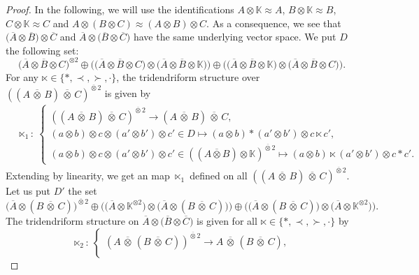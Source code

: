 \documentclass[10pt,a4paper]{amsart}
\numberwithin{equation}{section}
\theoremstyle{definition}
\theoremstyle{plain}
\newcommand{\K}{\mathbb{K}}
\begin{document}
\begin{proof}
In the following, we will use the identifications $A\otimes \K\approx A$, $B\otimes \K\approx B$, $C\otimes \K\approx C$ and $A\otimes(B\otimes C)\approx (A\otimes B)\otimes C$. As a consequence, we see that $\big(\overline{A}\otimes \overline{B}\big)\otimes \overline{C}$ and $\overline{A}\otimes \big(\overline{B}\otimes \overline{C}\big)$ have the same underlying vector space.
 We put $D$ the following set:
 \[
 \big(\overline{A} \otimes \overline{B}\otimes C\big)^{\otimes 2} \oplus\big(\big(\overline{A}\otimes \overline{B}\otimes C\big)\otimes \big(\overline{A}\otimes \overline{B}\otimes \K\big)\big) \oplus \big(\big(\overline{A}\otimes \overline{B}\otimes \K\big)\otimes \big(\overline{A}\otimes \overline{B}\otimes C\big)\big).
 \]
 For any $\ltimes\in\{*,\prec,\succ,\cdot\}$, the tridendriform structure over $((A \,\overline{\otimes}\, B)\,\overline{\otimes}\, C)^{\overline{\otimes} 2}$ is given by
	\begin{align*}
	&\ltimes_{1}\colon \ \begin{cases}
	 ((A \,\overline{\otimes}\, B)\,\overline{\otimes}\, C)^{\overline{\otimes} 2} \rightarrow (A\,\overline{\otimes}\,B)\,\overline{\otimes}\, C ,\\
	(a\otimes b)\otimes c \otimes (a'\otimes b')\otimes c'\in D \mapsto (a\otimes b)*(a'\otimes b')\otimes c\ltimes c', \\
	(a\otimes b)\otimes c \otimes (a'\otimes b')\otimes c'\in ((A\overline{\otimes} B)\otimes \K)^{\overline{\otimes} 2} \mapsto (a\otimes b)\ltimes(a'\otimes b')\otimes c* c'.
	\end{cases}
\end{align*}
Extending by linearity, we get an map $\ltimes_{1}$ defined on all $((A\,\overline{\otimes}\, B)\,\overline{\otimes}\, C)^{\overline{\otimes} 2}.$
Let us put $D'$ the set
\[
\big(\overline{A}\otimes (B\,\overline{\otimes}\,C)\big)^{\overline{\otimes} 2}\oplus \big(\big(\overline{A}\otimes \K^{\otimes 2}\big)\otimes \big(\overline{A}\otimes (B\,\overline{\otimes}\,C)\big)\big)\oplus \big(\big(\overline{A}\otimes (B\,\overline{\otimes}\,C)\big)\otimes \big(\overline{A}\otimes \K^{\otimes 2}\big)\big).
\]
The tridendriform structure on $\overline{A} \otimes \big(\overline{B}\otimes \overline{C}\big)$ is given for all $\ltimes\in \{ *,\prec,\succ,\cdot \}$ by
\begin{equation*}
	\ltimes_2\colon \ \begin{cases}
	 (A\,\overline{\otimes}\, (B\,\overline{\otimes}\, C))^{\overline{\otimes} 2} \rightarrow A\,\overline{\otimes}\,(B\,\overline{\otimes}\, C), \\

\end{cases}
\end{equation*}
\end{proof}
\end{document}
